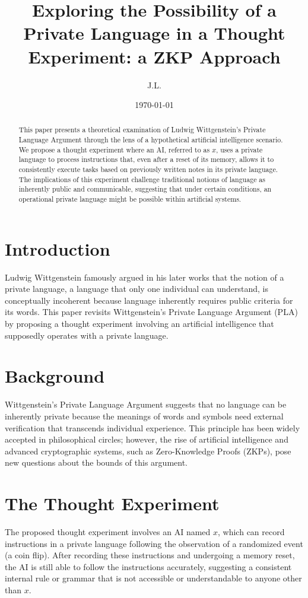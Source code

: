 \documentclass[12pt]{article}
\title{Exploring the Possibility of a Private Language in a Thought Experiment: a ZKP Approach}
\author{J.L.}
\date{\today}
\begin{document}
\maketitle

\begin{abstract}
This paper presents a theoretical examination of Ludwig Wittgenstein's Private Language Argument through the lens of a hypothetical artificial intelligence scenario. We propose a thought experiment where an AI, referred to as \( x \), uses a private language to process instructions that, even after a reset of its memory, allows it to consistently execute tasks based on previously written notes in its private language. The implications of this experiment challenge traditional notions of language as inherently public and communicable, suggesting that under certain conditions, an operational private language might be possible within artificial systems.
\end{abstract}

\section{Introduction}
Ludwig Wittgenstein famously argued in his later works that the notion of a private language, a language that only one individual can understand, is conceptually incoherent because language inherently requires public criteria for its words. This paper revisits Wittgenstein’s Private Language Argument (PLA) by proposing a thought experiment involving an artificial intelligence that supposedly operates with a private language.

\section{Background}
Wittgenstein’s Private Language Argument suggests that no language can be inherently private because the meanings of words and symbols need external verification that transcends individual experience. This principle has been widely accepted in philosophical circles; however, the rise of artificial intelligence and advanced cryptographic systems, such as Zero-Knowledge Proofs (ZKPs), pose new questions about the bounds of this argument.

\section{The Thought Experiment}
The proposed thought experiment involves an AI named \( x \), which can record instructions in a private language following the observation of a randomized event (a coin flip). After recording these instructions and undergoing a memory reset, the AI is still able to follow the instructions accurately, suggesting a consistent internal rule or grammar that is not accessible or understandable to anyone other than \( x \).
\end{document}
